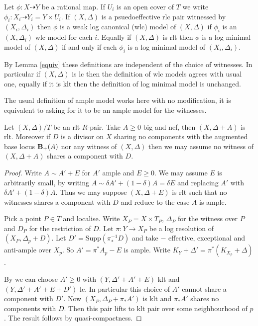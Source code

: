 	\begin{definition}
		Let $\phi:X \dashrightarrow Y$ be a rational map. If $U_{i}$ is an open cover of $T$ we write $\phi_{i}:X_{i}\dashrightarrow Y_{i}=Y\times U_{i}$.
		If $(X,\Delta)$ is a psuedoeffective rlc pair witnessed by $(X_{i},\Delta_{i})$ then $\phi$ is a weak log canonical (wlc) model of $(X,\Delta)$ if $\phi_{i}$ is an $(X,\Delta_{i})$ wlc model for each $i$. Equally if $(X,\Delta)$ is rlt then $\phi$ is a log minimal model of $(X,\Delta)$ if and only if each $\phi_{i}$ is a log minimal model of $(X_{i},\Delta_{i})$.
	\end{definition}
	
	By Lemma \ref{equiv} these definitions are independent of the choice of witnesses. In particular if $(X,\Delta)$ is lc then the definition of wlc models agrees with usual one, equally if it is klt then the definition of log minimal model is unchanged.
	
	\begin{remark}
		The usual definition of ample model works here with no modification, it is equivalent to asking for it to be an ample model for the witnesses.
	\end{remark}
	
	\begin{lemma}\label{bertini}
		Let $(X,\Delta)/T$ be an rlt $R$-pair. Take $A\geq 0$ big and nef, then $(X,\Delta+A)$ is rlt. Moreover if $D$ is a divisor on $X$ sharing no components with the augmented base locus $\mathbf{B}_{+}(A)$ nor any witness of $(X,\Delta)$ then we may assume no witness of $(X,\Delta+A)$ shares a component with $D$.
	\end{lemma}
	\begin{proof}
		Write $A \sim A'+E$ for $A'$ ample and $E \geq 0$. We may assume $E$ is arbitrarily small, by writing $A\sim \delta A' + (1-\delta)A=\delta E$ and replacing $A'$ with $\delta A' + (1-\delta)A$. Thus we may suppose $(X,\Delta+E)$ is rlt such that no witnesses shares a component with $D$ and reduce to the case $A$ is ample.
		
		Pick a point $P \in T$ and localise. Write $X_{P}=X \times T_{P}$, $\Delta_{P}$ for the witness over $P$ and $D_{P}$ for the restriction of $D$. Let $\pi:Y \to X_{P}$ be a log resolution of $(X_{P},\Delta_{p}+D)$. Let $D'=\text{Supp}(\pi^{-1}_{*}D)$ and take $-$ effective, exceptional and anti-ample over $X_{p}$. So $A'=\pi^{*}A_{p}-E$ is ample. Write $K_{Y}+\Delta'=\pi^{*}(K_{X_{p}}+\Delta)$.
		
		By \cite[Theorem 2.11]{bhatt2020globally+} we can choose $A'\geq 0$ with $(Y,\Delta'+A'+E)$ klt and $(Y,\Delta'+A'+E+D')$ lc. In particular this choice of $A'$ cannot share a component with $D'$. Now $(X_{P},\Delta_{P}+\pi_{*}A')$ is klt and $\pi_{*}A'$ shares no components with $D$. Then this pair lifts to klt pair over some neighbourhood of $p$. The result follows by quasi-compactness.
	\end{proof}

